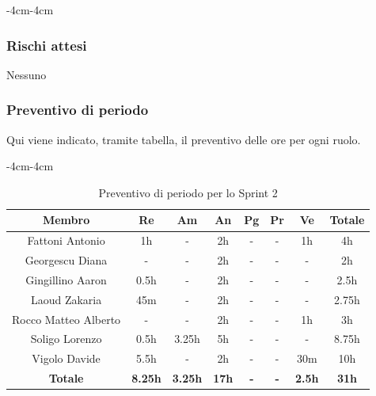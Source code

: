 \documentclass[a4paper,12pt]{article}
\begin{document}
\begin{table}[H]
\begin{adjustwidth}{-4cm}{-4cm}
    \caption{Attività previste per lo Sprint 2}
    \end{adjustwidth}
\end{table}

\subsubsection{Rischi attesi}
Nessuno

\subsubsection{Preventivo di periodo}
Qui viene indicato, tramite tabella, il preventivo delle ore per ogni ruolo.
\begin{table}[H]
    \begin{adjustwidth}{-4cm}{-4cm}
    \centering
    \begin{tabular}{|c|c|c|c|c|c|c|c|}
        \hline
        \textbf{Membro}& \textbf{Re} & \textbf{Am} & \textbf{An} & \textbf{Pg} & \textbf{Pr} & \textbf{Ve} & \textbf{Totale} \\
        \hline
        Fattoni Antonio & 1h & - & 2h & - & - & 1h & 4h\\
        \hline
        Georgescu Diana& - & - & 2h & - & - & - & 2h \\
        \hline
        Gingillino Aaron& 0.5h & - & 2h & - & - & - & 2.5h \\
        \hline
        Laoud Zakaria& 45m & - & 2h & - & - & - & 2.75h\\
        \hline
        Rocco Matteo Alberto & - & - & 2h & - & - & 1h & 3h\\
        \hline
        Soligo Lorenzo& 0.5h & 3.25h & 5h & - & - & - & 8.75h\\
        \hline
        Vigolo Davide & 5.5h & - & 2h & - & - & 30m & 10h \\
        \hline
        \textbf{Totale} & \textbf{8.25h}& \textbf{3.25h} & \textbf{17h}& \textbf{-}& \textbf{-}& \textbf{2.5h}& \textbf{31h}\\
        \hline
    \end{tabular}
    \caption{Preventivo di periodo per lo Sprint 2}
    \end{adjustwidth}
\end{table}
\end{document}
